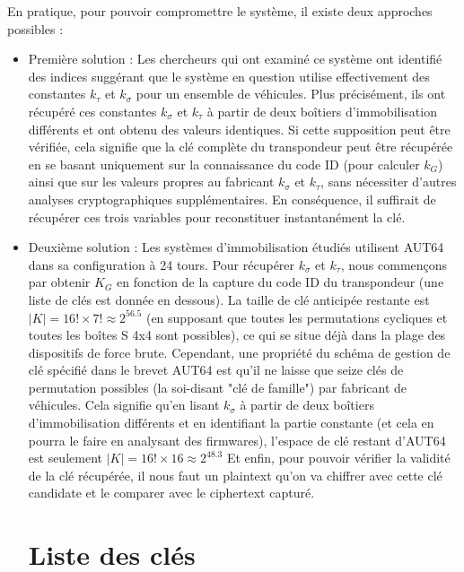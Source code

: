 \documentclass{template}
\begin{document}
En pratique, pour pouvoir compromettre le système, il existe deux approches possibles :
\begin{itemize}
    \item Première solution : Les chercheurs qui ont examiné ce système ont identifié des indices suggérant que le système en question utilise effectivement des constantes $k_\tau$ et $k_\sigma$ pour un ensemble de véhicules. Plus précisément, ils ont récupéré ces constantes $k_\sigma$ et $k_\tau$ à partir de deux boîtiers d'immobilisation différents et ont obtenu des valeurs identiques. Si cette supposition peut être vérifiée, cela signifie que la clé complète du transpondeur peut être récupérée en se basant uniquement sur la connaissance du code ID (pour calculer $k_G$) ainsi que sur les valeurs propres au fabricant $k_\sigma$ et $k_\tau$, sans nécessiter d'autres analyses cryptographiques supplémentaires. En conséquence, il suffirait de récupérer ces trois variables pour reconstituer instantanément la clé.
    
    \item Deuxième solution : Les systèmes d'immobilisation étudiés utilisent AUT64 dans sa configuration à 24 tours. Pour récupérer $k_\sigma$ et $k_\tau$, nous commençons par obtenir $K_G$ en fonction de la capture du code ID du transpondeur (une liste de clés est donnée en dessous). La taille de clé anticipée restante est $|K| = 16! \times 7! \approx 2^{56.5}$ (en supposant que toutes les permutations cycliques et toutes les boîtes S 4x4 sont possibles), ce qui se situe déjà dans la plage des dispositifs de force brute. Cependant, une propriété du schéma de gestion de clé spécifié dans le brevet AUT64 est qu'il ne laisse que seize clés de permutation possibles (la soi-disant "clé de famille") par fabricant de véhicules. Cela signifie qu'en lisant $k_\sigma$ à partir de deux boîtiers d'immobilisation différents et en identifiant la partie constante (et cela en pourra le faire en analysant des firmwares), l'espace de clé restant d'AUT64 est seulement $|K| = 16! \times 16 \approx 2^{48.3}$
    Et enfin, pour pouvoir vérifier la validité de la clé récupérée, il nous faut un plaintext qu'on va chiffrer avec cette  clé candidate et le comparer avec le ciphertext capturé.

\section{Liste des clés}
\baselineskip=16pt


\end{itemize}
\end{document}
